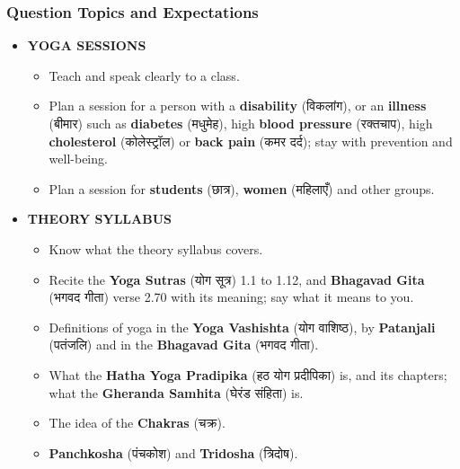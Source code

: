 \begin{frame}[fragile]\frametitle{Question Topics and Expectations}
    \begin{itemize}
        \item \textbf{YOGA SESSIONS}
        \begin{itemize}
            \item Teach and speak clearly to a class.
            \item Plan a session for a person with a \textbf{disability} (विकलांग), or an \textbf{illness} (बीमार) such as \textbf{diabetes} (मधुमेह), high \textbf{blood pressure} (रक्तचाप), high \textbf{cholesterol} (कोलेस्ट्रॉल) or \textbf{back pain} (कमर दर्द); stay with prevention and well-being.
            \item Plan a session for \textbf{students} (छात्र), \textbf{women} (महिलाएँ) and other groups.
        \end{itemize}
        \item \textbf{THEORY SYLLABUS}
        \begin{itemize}
            \item Know what the theory syllabus covers.
            \item Recite the \textbf{Yoga Sutras} (योग सूत्र) 1.1 to 1.12, and \textbf{Bhagavad Gita} (भगवद गीता) verse 2.70 with its meaning; say what it means to you.
            \item Definitions of yoga in the \textbf{Yoga Vashishta} (योग वाशिष्ठ), by \textbf{Patanjali} (पतंजलि) and in the \textbf{Bhagavad Gita} (भगवद गीता).
            \item What the \textbf{Hatha Yoga Pradipika} (हठ योग प्रदीपिका) is, and its chapters; what the \textbf{Gheranda Samhita} (घेरंड संहिता) is.
            \item The idea of the \textbf{Chakras} (चक्र).
            \item \textbf{Panchkosha} (पंचकोश) and \textbf{Tridosha} (त्रिदोष).
        \end{itemize}
    \end{itemize}
\end{frame}

